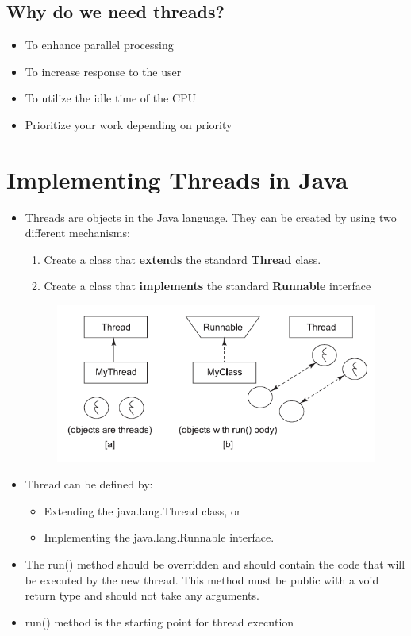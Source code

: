 \documentclass[12pt, a4paper]{book}
\begin{document}
\subsection{Why do we need threads?}
\begin{itemize}
    \item To  enhance parallel processing
    \item To increase response to the user
    \item To utilize the idle time of the CPU
    \item Prioritize your work depending on priority
\end{itemize}
\section{Implementing Threads in Java}
\begin{itemize}
    \item Threads are objects in the Java language. They can be created by using two different mechanisms:
          \begin{enumerate}
              \item Create a class that \textbf{extends} the standard \textbf{Thread} class.
              \item Create a class that \textbf{implements} the standard \textbf{Runnable} interface
          \end{enumerate}
          \begin{figure}
              \centering
              \includegraphics[width=0.8\linewidth]{figures/threads-in-java.png}
          \end{figure}

    \item Thread can be defined by:
          \begin{itemize}
              \item Extending the java.lang.Thread class, or
              \item Implementing the java.lang.Runnable interface.
          \end{itemize}
    \item The run() method should be overridden and should contain the code that will be executed by the new thread.
          This method must be public with a void return type and should not take any arguments.
    \item run() method is the starting point for thread execution
\end{itemize}
\end{document}
